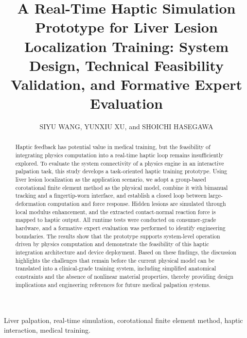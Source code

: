 \documentclass{ieeeaccess}
\begin{document}

\title{A Real-Time Haptic Simulation Prototype for Liver Lesion Localization Training: System Design, Technical Feasibility Validation, and Formative Expert Evaluation}
\author{\uppercase{Siyu Wang},
\uppercase{Yunxiu Xu},
and \uppercase{Shoichi Hasegawa}}
\address[1]{Department of Information and Communication Engineering, Institute of Science Tokyo, Yokohama, Japan (e-mail: siw131@haselab.net, yunxiu@haselab.net, hasevr@haselab.net)}

\begin{abstract}
Haptic feedback has potential value in medical training, but the feasibility of integrating physics computation into a real-time haptic loop remains insufficiently explored. To evaluate the system connectivity of a physics engine in an interactive palpation task, this study develops a task-oriented haptic training prototype. Using liver lesion localization as the application scenario, we adopt a group-based corotational finite element method as the physical model, combine it with bimanual tracking and a fingertip-worn interface, and establish a closed loop between large-deformation computation and force response. Hidden lesions are simulated through local modulus enhancement, and the extracted contact-normal reaction force is mapped to haptic output. All runtime tests were conducted on consumer-grade hardware, and a formative expert evaluation was performed to identify engineering boundaries. The results show that the prototype supports system-level operation driven by physics computation and demonstrate the feasibility of this haptic integration architecture and device deployment. Based on these findings, the discussion highlights the challenges that remain before the current physical model can be translated into a clinical-grade training system, including simplified anatomical constraints and the absence of nonlinear material properties, thereby providing design implications and engineering references for future medical palpation systems.
\end{abstract}

\begin{keywords}
Liver palpation, real-time simulation, corotational finite element method, haptic interaction, medical training.
\end{keywords}
\end{document}
